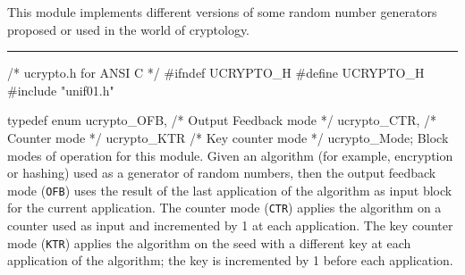 
This module implements different versions of some random number generators
proposed or used in the world of cryptology.

\newcommand{\aes}{\textrm{AES}}
\newcommand{\shaun}{\mbox{\textrm{SHA-1}}}
\newcommand{\calh}{{H}}
\newcommand{\cale}{{E}}


\bigskip
\hrule
\code\hide
/*  ucrypto.h  for ANSI C  */
#ifndef UCRYPTO_H
#define UCRYPTO_H
\endhide
#include "unif01.h"


typedef enum {
   ucrypto_OFB,                 /* Output Feedback mode */
   ucrypto_CTR,                 /* Counter mode */
   ucrypto_KTR                  /* Key counter mode */
   } ucrypto_Mode;
\endcode
 \tab  Block modes of operation \cite{rDWO01a} for this module. Given an algorithm
  (for example, encryption or hashing) used as a generator of random numbers, then
  the output feedback mode (\texttt{OFB}) uses the result of the last application
  of the algorithm as input block for the current application. The counter 
   mode (\texttt{CTR}) applies the algorithm on a counter used as input and 
  incremented by 1 at each application.  The key counter mode (\texttt{KTR}) 
  applies the algorithm on the seed with a different key at each application of
  the algorithm; the key is incremented by 1 before each application.   
 \endtab
\code


